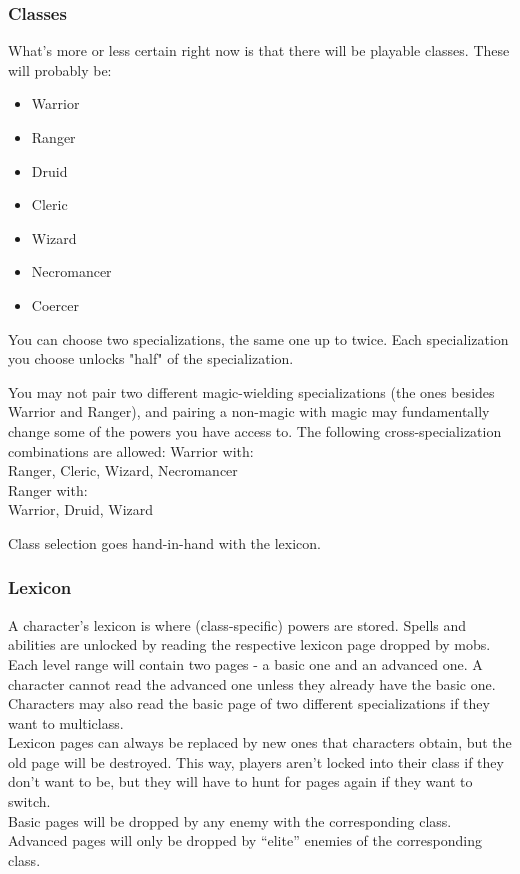 \documentclass{article}
\begin{document}
\subsubsection{Classes}
What's more or less certain right now is that there will be playable classes. These will probably be:
\begin{itemize}
    \item Warrior
    \item Ranger
    \item Druid
    \item Cleric
    \item Wizard
    \item Necromancer
    \item Coercer
\end{itemize}
You can choose two specializations, the same one up to twice. Each specialization you choose unlocks
"half" of the specialization.

You may not pair two different magic-wielding specializations (the ones besides Warrior and Ranger), and pairing
a non-magic with magic may fundamentally change some of the powers you have access to. The following
cross-specialization combinations are allowed:
Warrior with:\\
Ranger, Cleric, Wizard, Necromancer\\
Ranger with:\\
Warrior, Druid, Wizard

Class selection goes hand-in-hand with the lexicon.

\subsubsection{Lexicon}
A character's lexicon is where (class-specific) powers are stored.
Spells and abilities are unlocked by reading the respective lexicon page dropped by mobs. Each level
range will contain two pages - a basic one and an advanced one. A character cannot read the advanced
one unless they already have the basic one. Characters may also read the basic page of two different
specializations if they want to multiclass.\\
Lexicon pages can always be replaced by new ones that characters obtain, but the old page will
be destroyed. This way, players aren't locked into their class if they don't want to be, but they
will have to hunt for pages again if they want to switch.\\
Basic pages will be dropped by any enemy with the corresponding class.\\
Advanced pages will only be dropped by ``elite'' enemies of the corresponding class.
\end{document}
